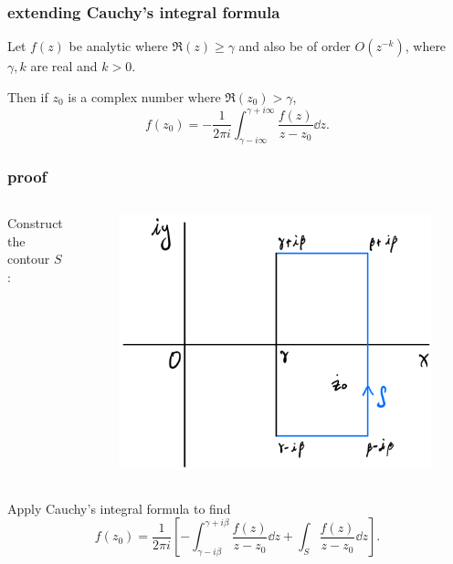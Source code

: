 \documentclass[mathserif]{beamer}
\newcommand{\sbr}[1]{\left[#1\right]}
\begin{document}
\begin{frame}
  \frametitle{extending Cauchy's integral formula}

  \begin{theorem}
    Let $f(z)$ be analytic where $\Re(z) \geq \gamma$ and also be of order $O(z^{-k})$, where $\gamma, k$ are real and $k> 0$. 
    
    Then if $z_0$ is a complex number where $\Re(z_0) > \gamma$, \[f(z_0) = -\frac{1}{2\pi i}\int_{\gamma-i\infty}^{\gamma + i\infty}\frac{f(z)}{z-z_0}\dd{z}.\]
  \end{theorem}


\end{frame}

\begin{frame}
  \frametitle{proof}

  \begin{columns}

    Construct the contour $S$:
    \begin{figure}[h]
      \centering
      \includegraphics[scale=0.25]{1}
    \end{figure}
  \end{columns}

  Apply Cauchy's integral formula to find \[f(z_0) = \frac{1}{2\pi i}\sbr{-\int_{\gamma-i\beta}^{\gamma + i\beta}\frac{f(z)}{z-z_0}\dd{z} + \int_S\frac{f(z)}{z-z_0}\dd{z}}.\] 


\end{frame}
\end{document}
